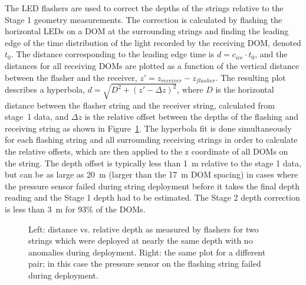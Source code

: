 The LED flashers are used to correct the depths of the
strings relative to the Stage 1 geometry measurements. The correction is
calculated by flashing the horizontal LEDs on a DOM at the surrounding strings and finding the leading edge of the time distribution of the
light recorded by the
receiving DOM, denoted $t_0$. The distance corresponding to the
leading edge time is $d = c_{ice} \cdot t_0$, and the distances for
all receiving DOMs are plotted as a function of the vertical distance
between the flasher and the receiver, $z' = z_{receiver} -
z_{flasher}$. The resulting plot describes a hyperbola, $d = \sqrt{D^2
+ (z' -\Delta z)^2}$, where $D$ is the horizontal distance between the
flasher string and the receiver string, calculated from stage~1 data,
and $\Delta z$ is the relative offset between the depths of the
flashing and receiving string as shown in Figure~\ref{fig:geohyperbola}. The hyperbola fit is done
simultaneously for each flashing string and all surrounding receiving
strings in order to calculate the relative offsets, which are then
applied to the z coordinate of all DOMs on the string. The depth offset is typically less than 1~m relative to the
stage 1 data, but can be as large as 20~m (larger than the 17~m DOM
spacing) in cases where the pressure sensor failed during string
deployment before it takes the final depth reading and the Stage 1 depth had to be estimated. The Stage 2 depth correction is less than 3~m for 93\% of the DOMs.

\begin{figure}[!h]
  \captionsetup[subfigure]{labelformat=empty}
  \centering
  \caption{Left: distance vs. relative depth as measured by flashers for two strings which were deployed at nearly the same depth with no anomalies during deployment. Right: the same plot for a different pair; in this case the pressure sensor on the flashing string failed during deployment.}
  \label{fig:geohyperbola}
\end{figure}


